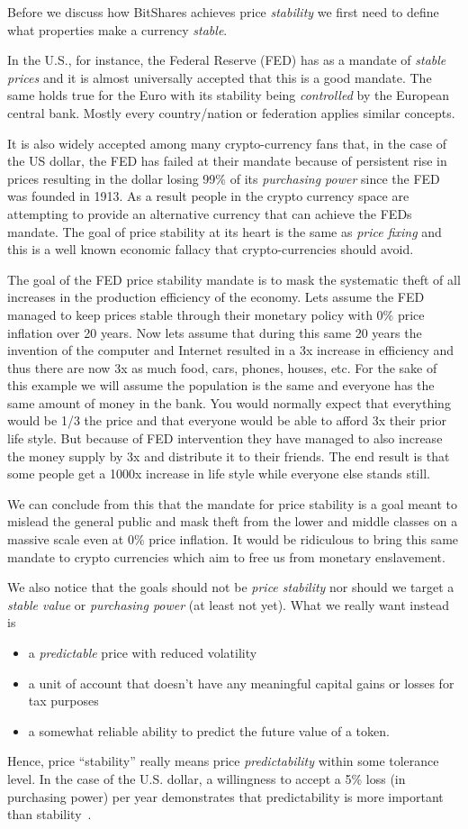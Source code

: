 Before we discuss how BitShares achieves price \emph{stability} we first need to
define what properties make a currency \emph{stable}.

In the U.S., for instance, the Federal Reserve (FED) has as a mandate of
\emph{stable prices} and it is almost universally accepted that this is a good
mandate. The same holds true for the Euro with its stability being
\emph{controlled} by the European central bank. Mostly every country/nation or
federation applies similar concepts.

It is also widely accepted among many crypto-currency fans that, in the case of
the US dollar, the FED has failed at their mandate because of persistent rise
in prices resulting in the dollar losing 99\% of its \emph{purchasing power}
since the FED was founded in 1913. As a result people in the crypto currency
space are attempting to provide an alternative currency that can achieve the
FEDs mandate. The goal of price stability at its heart is the same as
\emph{price fixing} and this is a well known economic fallacy that
crypto-currencies should avoid.

The goal of the FED price stability mandate is to mask the systematic theft of
all increases in the production efficiency of the economy. Lets assume the FED
managed to keep prices stable through their monetary policy with 0\% price
inflation over 20 years. Now lets assume that during this same 20 years the
invention of the computer and Internet resulted in a 3x increase in efficiency
and thus there are now 3x as much food, cars, phones, houses, etc. For the sake
of this example we will assume the population is the same and everyone has the
same amount of money in the bank. You would normally expect that everything
would be 1/3 the price and that everyone would be able to afford 3x their prior
life style. But because of FED intervention they have managed to also increase
the money supply by 3x and distribute it to their friends. The end result is
that some people get a 1000x increase in life style while everyone else stands
still.

We can conclude from this that the mandate for price stability is a goal meant
to mislead the general public and mask theft from the lower and middle classes
on a massive scale even at 0\% price inflation. It would be ridiculous to bring
this same mandate to crypto currencies which aim to free us from monetary
enslavement.

We also notice that the goals should not be \emph{price stability} nor should
we target a \emph{stable value} or \emph{purchasing power} (at least not yet). 
%
What we really want instead is 
\begin{itemize}
 \item a \emph{predictable} price with reduced volatility
 \item a unit of account that doesn't have any meaningful capital gains or
    losses for tax purposes
 \item a somewhat reliable ability to predict the future value of a token.
\end{itemize}

Hence, price ``stability'' really means price \emph{predictability} within some
tolerance level. In the case of the U.S. dollar, a willingness to accept a 5\%
loss (in purchasing power) per year demonstrates that predictability is more
important than stability~\cite{bm:stable:impossible}.
